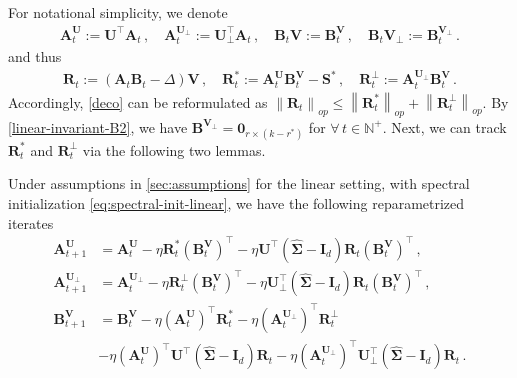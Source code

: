 For notational simplicity, we denote 
\begin{align*}
    \bm A^{\bm U}_t:=\bm U^{\!\top}\bm A_t\,,\quad \bm A^{\bm U_\perp}_t:=\bm U_\perp^{\!\top}\bm A_t\,,\quad \bm B_t \bm V:=\bm B_t^{\bm V}\,,\quad \bm B_t \bm V_\perp:=\bm B_t^{\bm V_\perp}\,.
\end{align*}
and thus
\begin{align*}
    \bm R_t := (\bm A_t \bm B_t - \Delta) \bm V \,,\quad \bm R_t^*:=\bm A^{\bm U}_t\bm B_t^{\bm V}-\bm S^*\,,\quad \bm R_t^\perp := \bm A^{\bm U_\perp}_t\bm B_t^{\bm V}\,.
\end{align*}
Accordingly, \cref{deco} can be reformulated as $\left\|\bm R_t\right\|_{op}\leq \left\|\bm R_t^*\right\|_{op}+\left\|\bm R_t^\perp\right\|_{op}$. By \cref{linear-invariant-B2}, we have $\bm B^{\bm V_\perp}=\bm 0_{r\times(k-r^*)}$ for $\forall\,t \in \mathbb{N}^+$.
Next, we can track $\bm R^*_t$ and $\bm R^\perp_t$ via the following two lemmas.
\begin{lemma}
    \label{A^U_t-B_t^V}
Under assumptions in \cref{sec:assumptions} for the linear setting, with spectral initialization \eqref{eq:spectral-init-linear}, we have the following reparametrized iterates
    \begin{align}
        \bm A^{\bm U}_{t+1} & = \bm A^{\bm U}_t - \eta \bm R^*_t \left(\bm B_t^{\bm V}\right)^{\!\top} - \eta \bm U^{\!\top}\left(\widehat{\bm \Sigma}
        - \bm I_d\right) \bm R_t \left(\bm B_t^{\bm V}\right)^{\!\top}\,,\label{AtU}\\
        \bm A^{\bm U_\perp}_{t+1} & = \bm A^{\bm U_\perp}_t - \eta \bm R^\perp_t \left(\bm B_t^{\bm V}\right)^{\!\top} - \eta \bm U^{\!\top}_\perp\left(\widehat{\bm \Sigma}
        - \bm I_d\right) \bm R_t \left(\bm B_t^{\bm V}\right)^{\!\top}\,,\label{AUperp}\\
        \bm B_{t+1}^{\bm V} & = \bm B_t^{\bm V} - \eta \left(\bm A^{\bm U}_t\right)^{\!\top}\bm R^*_t - \eta \left(\bm A^{\bm U_\perp}_t\right)^{\!\top}\bm R^\perp_t\nonumber\\
        & - \eta \left(\bm A_t^{\bm U}\right)^{\!\top}\bm U^{\!\top}\left(\widehat{\bm \Sigma}-\bm I_d\right)\bm R_t  - \eta \left(\bm A_t^{\bm U_\perp}\right)^{\!\top}\bm U_\perp^{\!\top}\left(\widehat{\bm \Sigma}-\bm I_d\right)\bm R_t\label{BVt}\,.
    \end{align}
\end{lemma}
